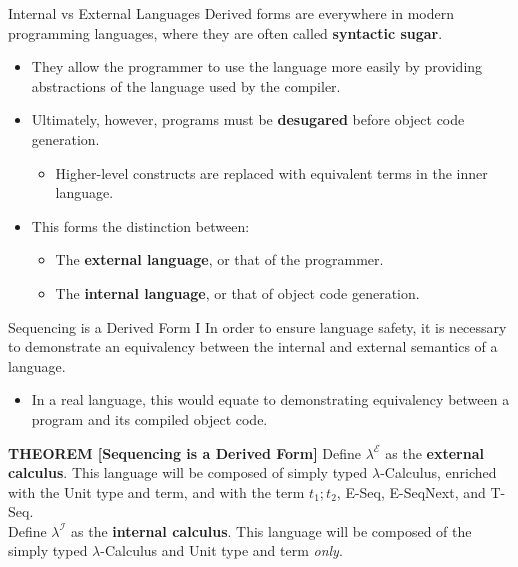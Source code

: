 \documentclass[11pt]{beamer}
\begin{document}
\begin{frame}{Internal vs External Languages}
Derived forms are everywhere in modern programming languages, where they are often called \textbf{syntactic sugar}.
\begin{itemize}
\item They allow the programmer to use the language more easily by providing abstractions of the language used by the compiler.  
\item Ultimately, however, programs must be \textbf{desugared} before object code generation.  
\begin{itemize}
\item Higher-level constructs are replaced with equivalent terms in the inner language.  
\end{itemize}
\item This forms the distinction between:
\begin{itemize}
\item The \textbf{external language}, or that of the programmer.
\item The \textbf{internal language}, or that of object code generation. 
\end{itemize}
\end{itemize}
\end{frame}

\begin{frame}[fragile=singleslide]{Sequencing is a Derived Form I}
In order to ensure language safety, it is necessary to demonstrate an equivalency between the internal and external semantics of a language.
\begin{itemize}
\item In a real language, this would equate to demonstrating equivalency between a program and its compiled object code.  
\end{itemize}
\vspace{1em}
\textbf{THEOREM [Sequencing is a Derived Form]}
Define $\lambda^\mathcal{E}$ as the \textbf{external calculus}.  This language will be composed of simply typed $\lambda$-Calculus, enriched with the Unit type and term, and with the term $t_1 ; t_2$, E-Seq, E-SeqNext, and T-Seq. \\
\vspace{1em}
Define $\lambda^\mathcal{I}$ as the \textbf{internal calculus}.  This language will be composed of the simply typed $\lambda$-Calculus and Unit type and term \emph{only}.
\end{frame}
\end{document}
